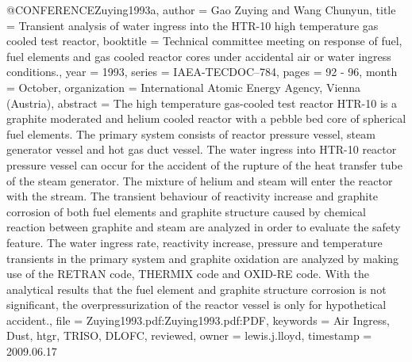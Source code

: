 {{@CONFERENCE{Zuying1993a,
  author = {Gao Zuying and Wang Chunyun},
  title = {Transient analysis of water ingress into the HTR-10 high temperature
	gas cooled test reactor},
  booktitle = {Technical committee meeting on response of fuel, fuel elements and
	gas cooled reactor cores under accidental air or water ingress conditions.},
  year = {1993},
  series = {IAEA-TECDOC--784},
  pages = {92 - 96},
  month = {October},
  organization = {International Atomic Energy Agency, Vienna (Austria)},
  abstract = {The high temperature gas-cooled test reactor HTR-10 is a graphite
	moderated and helium cooled reactor with a pebble bed core of spherical
	fuel elements. The primary system consists of reactor pressure vessel,
	steam generator vessel and hot gas duct vessel. The water ingress
	into HTR-10 reactor pressure vessel can occur for the accident of
	the rupture of the heat transfer tube of the steam generator. The
	mixture of helium and steam will enter the reactor with the stream.
	The transient behaviour of reactivity increase and graphite corrosion
	of both fuel elements and graphite structure caused by chemical reaction
	between graphite and steam are analyzed in order to evaluate the
	safety feature. The water ingress rate, reactivity increase, pressure
	and temperature transients in the primary system and graphite oxidation
	are analyzed by making use of the RETRAN code, THERMIX code and OXID-RE
	code. With the analytical results that the fuel element and graphite
	structure corrosion is not significant, the overpressurization of
	the reactor vessel is only for hypothetical accident.},
  file = {Zuying1993.pdf:Zuying1993.pdf:PDF},
  keywords = {Air Ingress, Dust, htgr, TRISO, DLOFC, reviewed},
  owner = {lewis.j.lloyd},
  timestamp = {2009.06.17}
}

}}
